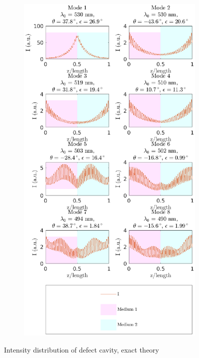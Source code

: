 \begin{figure}
\begin{subfigure}{\linewidth}
		\includegraphics[height=0.7\textheight]{plots/defect/intensity_distribution_oseen}
		\caption{}
	\end{subfigure}
	\caption[Intensity distribution of defect cavity, exact theory]{Intensity distribution of defect cavity, exact theory}
	\label{fig:defect_intensity_appendix}
\end{figure}

